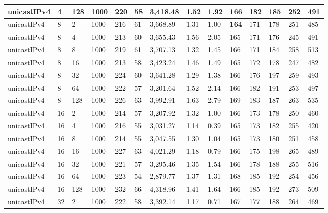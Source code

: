 \begin{table}[!htb]
\begin{tabular}{@{}llllllllllllll@{}}
		unicastIPv4 & 4            & 128   & 1000 & 220  & 58  & 3,418.48 & 1.52     & 1.92     & 166 & 182 & 185 & 252 & 491  \\ \hline
		unicastIPv4 & 8            & 2     & 1000 & 216  & 61  & 3,668.89 & 1.31     & 1.00     & \textbf{164} & 171 & 178 & 251 & 485  \\
		unicastIPv4 & 8            & 4     & 1000 & 213  & 60  & 3,655.43 & 1.56     & 2.05     & 165 & 171 & 176 & 245 & 491  \\
		unicastIPv4 & 8            & 8     & 1000 & 219  & 61  & 3,707.13 & 1.32     & 1.45     & 166 & 171 & 184 & 258 & 513  \\
		unicastIPv4 & 8            & 16    & 1000 & 213  & 58  & 3,423.24 & 1.46     & 1.49     & 165 & 172 & 178 & 247 & 482  \\
		unicastIPv4 & 8            & 32    & 1000 & 224  & 60  & 3,641.28 & 1.29     & 1.38     & 166 & 176 & 197 & 259 & 493  \\
		unicastIPv4 & 8            & 64    & 1000 & 222  & 57  & 3,201.64 & 1.52     & 2.14     & 166 & 182 & 191 & 253 & 497  \\
		unicastIPv4 & 8            & 128   & 1000 & 226  & 63  & 3,992.91 & 1.63     & 2.79     & 169 & 183 & 187 & 263 & 535  \\ \hline
		unicastIPv4 & 16           & 2     & 1000 & 214  & 57  & 3,207.92 & 1.32     & 1.00     & 166 & 173 & 178 & 250 & 460  \\
		unicastIPv4 & 16           & 4     & 1000 & 216  & 55  & 3,031.27 & 1.14     & 0.39     & 165 & 173 & 182 & 255 & 420  \\
		unicastIPv4 & 16           & 8     & 1000 & 214  & 55  & 3,047.55 & 1.30     & 1.04     & 165 & 173 & 180 & 251 & 458  \\
		unicastIPv4 & 16           & 16    & 1000 & 227  & 63  & 4,021.29 & 1.18     & 0.79     & 166 & 175 & 198 & 265 & 489  \\
		unicastIPv4 & 16           & 32    & 1000 & 221  & 57  & 3,295.46 & 1.35     & 1.54     & 166 & 178 & 188 & 255 & 516  \\
		unicastIPv4 & 16           & 64    & 1000 & 223  & 54  & 2,879.77 & 1.37     & 1.31     & 168 & 185 & 192 & 254 & 456  \\
		unicastIPv4 & 16           & 128   & 1000 & 232  & 66  & 4,318.96 & 1.41     & 1.64     & 166 & 185 & 192 & 273 & 509  \\ \hline
		unicastIPv4 & 32           & 2     & 1000 & 222  & 58  & 3,392.14 & 1.17     & 0.71     & 167 & 177 & 188 & 264 & 469  \\

\end{tabular}
\end{table}
